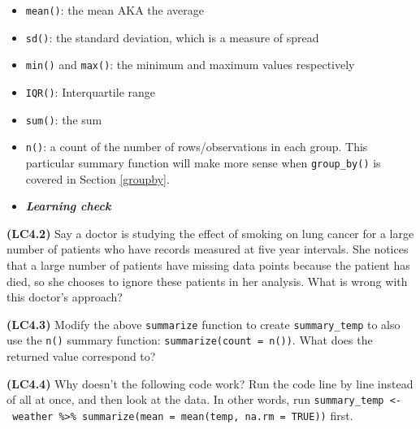 \documentclass[12pt, krantz2,]{krantz}
\makeatletter
\newenvironment{Shaded}{\begin{snugshade}}{\end{snugshade}}
\newcommand{\DataTypeTok}[1]{\textcolor[rgb]{0.27,0.27,0.27}{#1}}
\newcommand{\KeywordTok}[1]{\textcolor[rgb]{0.27,0.27,0.27}{\textbf{#1}}}
\newcommand{\NormalTok}[1]{#1}
\newcommand{\OperatorTok}[1]{\textcolor[rgb]{0.43,0.43,0.43}{\textbf{#1}}}
\newcommand{\OtherTok}[1]{\textcolor[rgb]{0.37,0.37,0.37}{#1}}
\newcommand{\StringTok}[1]{\textcolor[rgb]{0.5,0.5,0.5}{#1}}
\providecommand{\tightlist}{%
  \setlength{\itemsep}{0pt}\setlength{\parskip}{0pt}}
\newenvironment{kframe}{%
\medskip{}
\setlength{\fboxsep}{.8em}
 \def\at@end@of@kframe{}%
 \ifinner\ifhmode%
  \def\at@end@of@kframe{\end{minipage}}%
  \begin{minipage}{\columnwidth}%
 \fi\fi%
 \def\FrameCommand##1{\hskip\@totalleftmargin \hskip-\fboxsep
 \colorbox{shadecolor}{##1}\hskip-\fboxsep
     \hskip-\linewidth \hskip-\@totalleftmargin \hskip\columnwidth}%
 \MakeFramed {\advance\hsize-\width
   \@totalleftmargin\z@ \linewidth\hsize
   \@setminipage}}%
 {\par\unskip\endMakeFramed%
 \at@end@of@kframe}
\renewenvironment{Shaded}{\begin{kframe}}{\end{kframe}}
\newenvironment{rmdblock}[1]
  {\begin{shaded*}
  \begin{itemize}
  \renewcommand{\labelitemi}{
    \raisebox{-.7\height}[0pt][0pt]{
    }
  }
  \item
  }
  {
  \end{itemize}
  \end{shaded*}
  }
\newenvironment{learncheck}
  {\begin{rmdblock}{warning}}
  {\end{rmdblock}}
\makeatother
\begin{document}
\begin{itemize}
\tightlist
\item
  \texttt{mean()}: the mean AKA the average
\item
  \texttt{sd()}: the standard deviation, which is a measure of spread
\item
  \texttt{min()} and \texttt{max()}: the minimum and maximum values respectively
\item
  \texttt{IQR()}: Interquartile range
\item
  \texttt{sum()}: the sum
\item
  \texttt{n()}: a count of the number of rows/observations in each group. This particular summary function will make more sense when \texttt{group\_by()} is covered in Section \ref{groupby}.
\end{itemize}

\begin{learncheck}
\textbf{\emph{Learning check}}
\end{learncheck}

\textbf{(LC4.2)} Say a doctor is studying the effect of smoking on lung cancer for a large number of patients who have records measured at five year intervals. She notices that a large number of patients have missing data points because the patient has died, so she chooses to ignore these patients in her analysis. What is wrong with this doctor's approach?

\textbf{(LC4.3)} Modify the above \texttt{summarize} function to create \texttt{summary\_temp} to also use the \texttt{n()} summary function: \texttt{summarize(count\ =\ n())}. What does the returned value correspond to?

\textbf{(LC4.4)} Why doesn't the following code work? Run the code line by line instead of all at once, and then look at the data. In other words, run \texttt{summary\_temp\ \textless{}-\ weather\ \%\textgreater{}\%\ summarize(mean\ =\ mean(temp,\ na.rm\ =\ TRUE))} first.

\begin{Shaded}
\end{Shaded}
\end{document}

